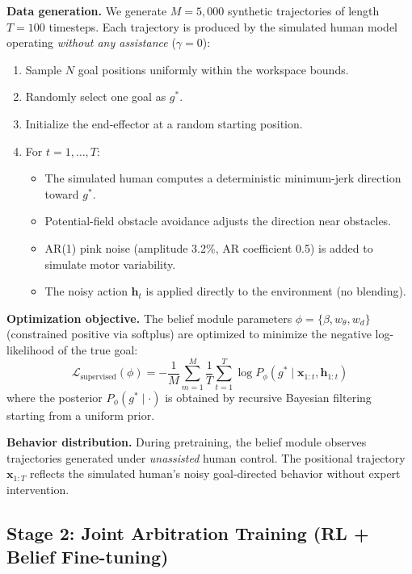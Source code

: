 \documentclass[11pt]{article}
\newcommand{\hvec}{\mathbf{h}_t}
\begin{document}
\textbf{Data generation.}
We generate $M = 5{,}000$ synthetic trajectories of length $T = 100$ timesteps.
Each trajectory is produced by the simulated human model operating \emph{without any assistance} ($\gamma = 0$):
\begin{enumerate}
    \item Sample $N$ goal positions uniformly within the workspace bounds.
    \item Randomly select one goal as $g^*$.
    \item Initialize the end-effector at a random starting position.
    \item For $t = 1, \ldots, T$:
    \begin{itemize}
        \item The simulated human computes a deterministic minimum-jerk direction toward $g^*$.
        \item Potential-field obstacle avoidance adjusts the direction near obstacles.
        \item AR(1) pink noise (amplitude 3.2\%, AR coefficient 0.5) is added to simulate motor variability.
        \item The noisy action $\hvec$ is applied directly to the environment (no blending).
    \end{itemize}
\end{enumerate}

\textbf{Optimization objective.}
The belief module parameters $\phi = \{\beta, w_\theta, w_d\}$ (constrained positive via softplus) are optimized to minimize the negative log-likelihood of the true goal:
\begin{equation}
    \mathcal{L}_{\text{supervised}}(\phi) = -\frac{1}{M}\sum_{m=1}^{M}\frac{1}{T}\sum_{t=1}^{T} \log P_\phi(g^* \mid \mathbf{x}_{1:t}, \mathbf{h}_{1:t})
    \label{eq:sup-loss}
\end{equation}
where the posterior $P_\phi(g^* \mid \cdot)$ is obtained by recursive Bayesian filtering starting from a uniform prior.

\textbf{Behavior distribution.}
During pretraining, the belief module observes trajectories generated under \emph{unassisted} human control.
The positional trajectory $\mathbf{x}_{1:T}$ reflects the simulated human's noisy goal-directed behavior without expert intervention.

\subsection{Stage 2: Joint Arbitration Training (RL + Belief Fine-tuning)}
\end{document}
